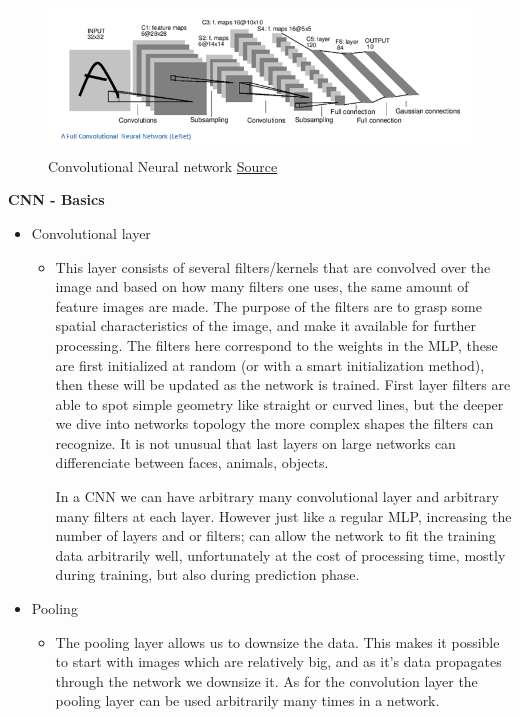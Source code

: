 \documentclass[Report.tex]{subfiles}
\begin{document}
\begin{figure}[H]
  \centering
  \includegraphics[height=4cm]{res/LeNet.png}
  \caption{Convolutional Neural network \href{https://adeshpande3.github.io/A-Beginner\%27s-Guide-To-Understanding-Convolutional-Neural-Networks/}{Source}}
  \label{fig:CNN_architecture}
\end{figure}

\begin{flushleft}
  \textbf{CNN - Basics} \\
  \begin{itemize}
   \item{Convolutional layer}
   \begin{itemize}
    \item{This layer consists of several filters/kernels that are convolved over the image and based on how many filters one uses, the same amount of feature images are made. The purpose of the filters are to grasp some spatial characteristics of the image, and make it available for further processing.
    The filters here correspond to the weights in the MLP, these are first initialized at random (or with a smart initialization method), then these will be updated as the network is trained.
First layer filters are able to spot simple geometry like straight or curved lines, but the deeper we dive into networks topology the more complex shapes the filters can recognize. It is not unusual that last layers on large networks can differenciate between faces, animals, objects.\par
    In a CNN we can have arbitrary many convolutional layer and arbitrary many filters at each layer. However just like a regular MLP, increasing the number of layers and or filters; can allow the network to fit the training data arbitrarily well, unfortunately at the cost of processing time, mostly during training, but also during prediction phase.}
   \end{itemize}
   \item{Pooling}
   \begin{itemize}
    \item{The pooling layer allows us to downsize the data. This makes it possible to start with images which are relatively big, and as it's data propagates through the network we downsize it. As for the convolution layer the pooling layer can be used arbitrarily many times in a network.
}
\end{itemize}
\end{itemize}
\end{flushleft}
\end{document}
